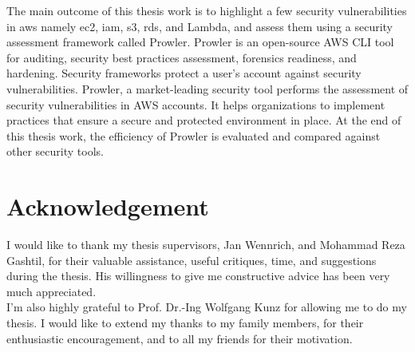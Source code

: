 \documentclass[a4paper,11pt]{report}
\newcommand\blankpage{%
    \null
    \thispagestyle{empty}%
    \addtocounter{page}{-1}%
    \newpage}
\begin{document}
\hfill \break
The main outcome of this thesis work is to highlight a
few security vulnerabilities in \gls{aws} namely
\gls{ec2}, \gls{iam},
\gls{s3}, \gls{rds}, and Lambda, and assess them using a
security assessment framework called Prowler.
Prowler is an open-source AWS CLI tool for auditing, security best practices assessment, forensics readiness, and hardening.
Security frameworks protect a user’s account against security vulnerabilities.
Prowler, a market-leading security tool performs the assessment of security vulnerabilities in AWS accounts.
It helps organizations to implement practices that ensure a secure and protected environment in place.
At the end of this thesis work, the efficiency of Prowler is evaluated and compared against other security tools.

\afterpage{\blankpage}
\cleardoublepage

\section*{Acknowledgement}
\text I would like to thank my thesis supervisors, Jan Wennrich, and Mohammad Reza Gashtil, for their valuable assistance, useful critiques, time, and suggestions during the thesis.
His willingness to give me constructive advice has been very much appreciated.
\\
I’m also highly grateful to Prof.
Dr.-Ing Wolfgang Kunz for allowing me to do my thesis.
I would like to extend my thanks to my family members,
for their enthusiastic encouragement, and to all my
friends for their motivation.

\afterpage{\blankpage}
\cleardoublepage

\tableofcontents










\clearpage
{}
\listoffigures
\pagebreak
{}
\listoftables
\pagebreak
{}
\lstlistoflistings
{}
\glsaddall
\pagebreak
\printnoidxglossary[type=\acronymtype,style=long,
    title=List of Abbreviations,nonumberlist]


\end{document}
